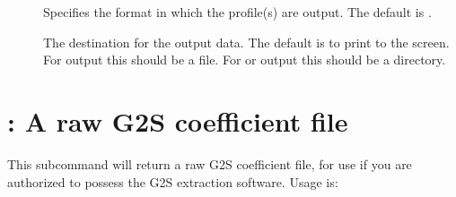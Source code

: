 \documentclass[letterpaper,10pt,english]{sphinxmanual}
\begin{document}
\sphinxAtStartPar
{}
\begin{description}
\item[{}] \leavevmode
\sphinxAtStartPar
Specifies the format in which the profile(s) are output.  The default is .

\item[{}] \leavevmode
\sphinxAtStartPar
The destination for the output data.  The default is to print to the screen.  For  output this should be a file.  For  or  output this should be a directory.

\item[{}] \leavevmode
\sphinxAtStartPar
{}

\sphinxAtStartPar
{}

\end{description}


\section{: A raw G2S coefficient file}
\label{\detokenize{userguide:raw-a-raw-g2s-coefficient-file}}
\sphinxAtStartPar
This subcommand will return a raw G2S coefficient file, for use if you are authorized to possess the G2S extraction software.  Usage is:
\end{document}
